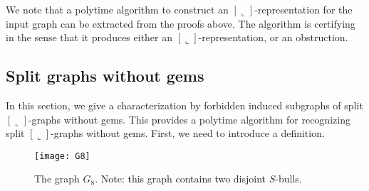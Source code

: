 \documentclass[11pt,3p,times]{elsarticle}
\newcommand{\La}{\ensuremath{\llcorner}} \newcommand{\Lb}{\ensuremath{\ulcorner}} \newcommand{\Lc}{\ensuremath{\lrcorner}} \newcommand{\Ld}{\ensuremath{\urcorner}}
\begin{document}
We note that a polytime algorithm to construct an
$[\La]$-representation for the input graph can be extracted from
the proofs above. The algorithm is certifying in the sense that it
produces either an $[\La]$-representation, or an obstruction.

\subsection{Split graphs without gems}
In this section, we give a characterization by forbidden induced
subgraphs of split $[\La]$-graphs without gems. This provides a
polytime algorithm for recognizing split $[\La]$-graphs without
gems. First, we need to introduce a definition.

\begin{figure}[h]
\centering
\texttt{[image: G8]}
\caption{The graph $G_8$. Note: this graph contains two disjoint $S$-bulls.}
\label{fig:G8}
\end{figure}
\end{document}
